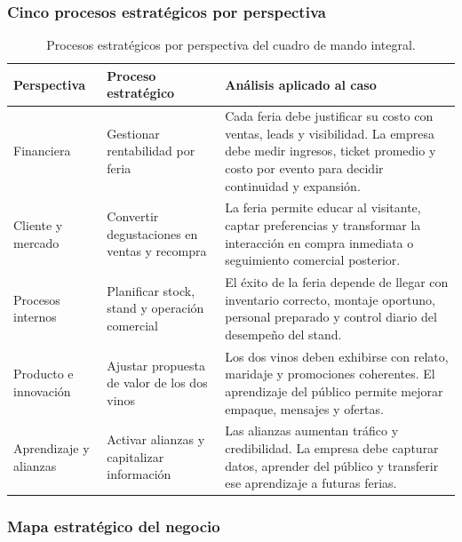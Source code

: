 \documentclass[10pt,a4paper]{article}
\begin{document}
\subsubsection{Cinco procesos estrat\'egicos por perspectiva}

\begin{table}[H]
\centering
\caption{Procesos estrat\'egicos por perspectiva del cuadro de mando integral.}
\label{tab:procesos}
\small
\begin{tabular}{p{2.8cm} p{3.5cm} p{7.5cm}}
\toprule
\textbf{Perspectiva} & \textbf{Proceso estrat\'egico} & \textbf{An\'alisis aplicado al caso} \\
\midrule
Financiera & Gestionar rentabilidad por feria & Cada feria debe justificar su costo con ventas, leads y visibilidad. La empresa debe medir ingresos, ticket promedio y costo por evento para decidir continuidad y expansi\'on. \\
Cliente y mercado & Convertir degustaciones en ventas y recompra & La feria permite educar al visitante, captar preferencias y transformar la interacci\'on en compra inmediata o seguimiento comercial posterior. \\
Procesos internos & Planificar stock, stand y operaci\'on comercial & El \'exito de la feria depende de llegar con inventario correcto, montaje oportuno, personal preparado y control diario del desempe\~no del stand. \\
Producto e innovaci\'on & Ajustar propuesta de valor de los dos vinos & Los dos vinos deben exhibirse con relato, maridaje y promociones coherentes. El aprendizaje del p\'ublico permite mejorar empaque, mensajes y ofertas. \\
Aprendizaje y alianzas & Activar alianzas y capitalizar informaci\'on & Las alianzas aumentan tr\'afico y credibilidad. La empresa debe capturar datos, aprender del p\'ublico y transferir ese aprendizaje a futuras ferias. \\
\bottomrule
\end{tabular}
\end{table}

\subsubsection{Mapa estrat\'egico del negocio}

\end{document}
